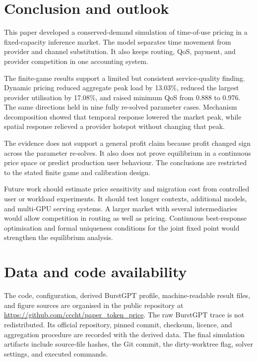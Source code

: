 \documentclass[11pt,a4paper]{article}
\begin{document}
\section{Conclusion and outlook}
\label{sec:conclusion}

This paper developed a conserved-demand simulation of time-of-use pricing in a fixed-capacity inference market. The model separates time movement from provider and channel substitution. It also keeps routing, QoS, payment, and provider competition in one accounting system.

The finite-game results support a limited but consistent service-quality finding. Dynamic pricing reduced aggregate peak load by 13.03\%, reduced the largest provider utilisation by 17.08\%, and raised minimum QoS from 0.888 to 0.976. The same directions held in nine fully re-solved parameter cases. Mechanism decomposition showed that temporal response lowered the market peak, while spatial response relieved a provider hotspot without changing that peak.

The evidence does not support a general profit claim because profit changed sign across the parameter re-solves. It also does not prove equilibrium in a continuous price space or predict production user behaviour. The conclusions are restricted to the stated finite game and calibration design.

Future work should estimate price sensitivity and migration cost from controlled user or workload experiments. It should test longer contexts, additional models, and multi-GPU serving systems. A larger market with several intermediaries would allow competition in routing as well as pricing. Continuous best-response optimisation and formal uniqueness conditions for the joint fixed point would strengthen the equilibrium analysis.

\section*{Data and code availability}

The code, configuration, derived BurstGPT profile, machine-readable result files, and figure sources are organised in the public repository at \url{https://github.com/cccht/paper_token_price}. The raw BurstGPT trace is not redistributed. Its official repository, pinned commit, checksum, licence, and aggregation procedure are recorded with the derived data. The final simulation artifacts include source-file hashes, the Git commit, the dirty-worktree flag, solver settings, and executed commands.
\end{document}
